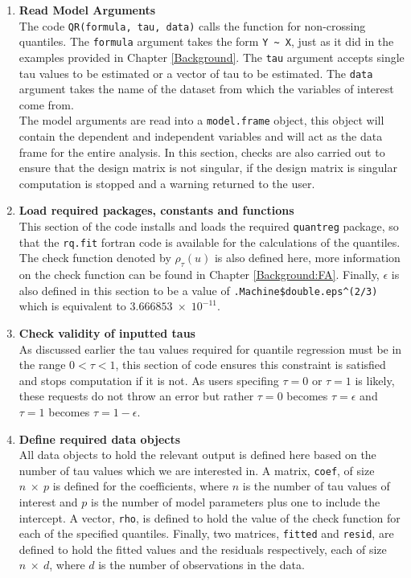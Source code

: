 \documentclass[12pt,a4paper]{report}
\begin{document}
\begin{enumerate}[1)]
    \item \textbf{Read Model Arguments}
    \\ The code {\small{\verb"QR(formula, tau, data)"}} calls the function for non-crossing quantiles. The {\small{\verb"formula"}} argument takes the form {\small{\verb"Y ~ X"}}, just as it did in the examples provided in Chapter \ref{Background}. The {\small{\verb"tau"}} argument accepts single tau values to be estimated or a vector of tau to be estimated. The {\small{\verb"data"}} argument takes the name of the dataset from which the variables of interest come from. \\
    The model arguments are read into a {\small{\verb"model.frame"}} object, this object will contain the dependent and independent variables and will act as the data frame for the entire analysis. In this section, checks are also carried out to ensure that the design matrix is not singular, if the design matrix is singular computation is stopped and a warning returned to the user.
    \item \textbf{Load required packages, constants and functions}
    \\ This section of the code installs and loads the required {\small{\verb"quantreg"}} package, so that the {\small{\verb"rq.fit"}} fortran code is available for the calculations of the quantiles. The check function denoted by $\rho_{\tau}(u)$ is also defined here, more information on the check function can be found in Chapter \ref{Background:FA}. Finally, $\epsilon$ is also defined in this section to be a value of {\small{\verb".Machine$double.eps^(2/3)"}} which is equivalent to $3.666853\; \times \;10^{-11}$.
    \item \textbf{Check validity of inputted taus}
    \\ As discussed earlier the tau values required for quantile regression must be in the range $0<\tau<1$, this section of code ensures this constraint is satisfied and stops computation if it is not. As users specifing $\tau=0$ or $\tau=1$ is likely, these requests do not throw an error but rather $\tau=0$ becomes $\tau=\epsilon$ and $\tau=1$ becomes $\tau=1-\epsilon$.
    \item \textbf{Define required data objects}
    \\ All data objects to hold the relevant output is defined here based on the number of tau values which we are interested in. A matrix, {\small{\verb"coef"}}, of size $n\:\times\:p$ is defined for the coefficients, where $n$ is the number of tau values of interest and $p$ is the number of model parameters plus one to include the intercept. A vector, {\small{\verb"rho"}}, is defined to hold the value of the check function for each of the specified quantiles. Finally, two matrices, {\small{\verb"fitted"}} and {\small{\verb"resid"}}, are defined to hold the fitted values and the residuals respectively, each of size $n\:\times\:d$, where $d$ is the number of observations in the data.

\end{enumerate}
\end{document}
